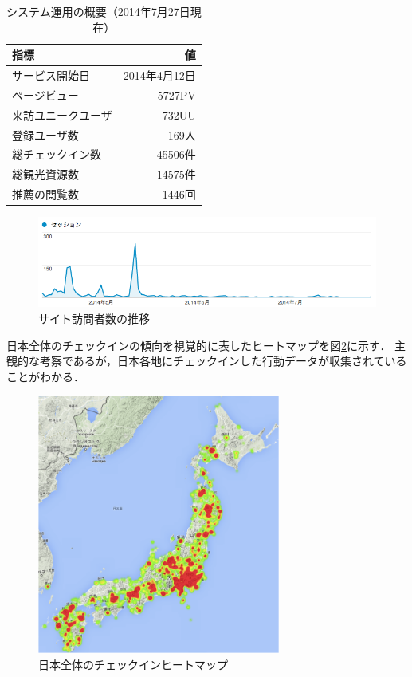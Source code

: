 \documentclass{jsarticle}
\begin{document}
\begin{table}[!h]
\small
\caption{システム運用の概要（2014年7月27日現在）}
\begin{center}
\begin{tabular}{l|r}
\label{operation_description}
指標 & 値 \\ \hline
サービス開始日 & 2014年4月12日 \\
ページビュー & 5727PV \\
来訪ユニークユーザ & 732UU \\
登録ユーザ数 & 169人 \\
総チェックイン数 & 45506件 \\
総観光資源数 & 14575件 \\
推薦の閲覧数 & 1446回 \\
\end{tabular}
\end{center}
\end{table}

\begin{figure}[!ht]
\begin{center}
\includegraphics[width=15.0cm]{./image/proc_users.png}
\caption{サイト訪問者数の推移}
\label{proc_users}
\end{center}
\end{figure}
    
日本全体のチェックインの傾向を視覚的に表したヒートマップを図\ref{heatmap1}に示す．
主観的な考察であるが，日本各地にチェックインした行動データが収集されていることがわかる．

\begin{figure}[!ht]
\begin{center}
\includegraphics[width=8.0cm]{./image/heatmap1.png}
\caption{日本全体のチェックインヒートマップ}
\label{heatmap1}
\end{center}
\end{figure}
\end{document}
